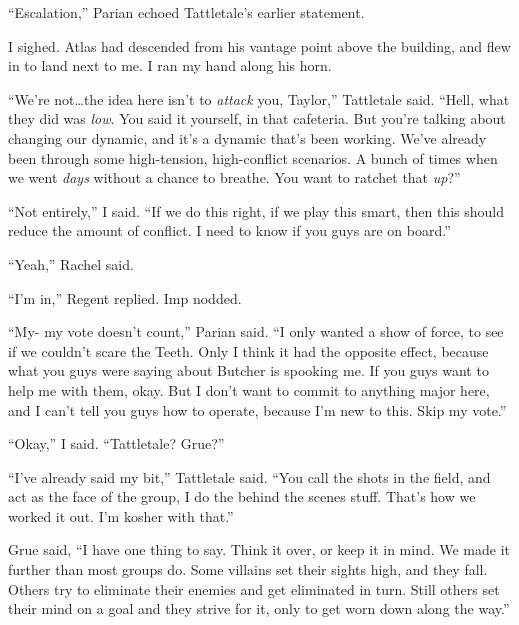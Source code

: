 ``Escalation,'' Parian echoed Tattletale's earlier statement.



I sighed.  Atlas had descended from his vantage point above the building, and flew in to land next to me.  I ran my hand along his horn.



``We're not\ldots the idea here isn't to \emph{attack} you, Taylor,'' Tattletale said.  ``Hell, what they did was \emph{low}.  You said it yourself, in that cafeteria.  But you're talking about changing our dynamic, and it's a dynamic that's been working.  We've already been through some high-tension, high-conflict scenarios.  A bunch of times when we went \emph{days} without a chance to breathe.  You want to ratchet that \emph{up}?''



``Not entirely,'' I said.  ``If we do this right, if we play this smart, then this should reduce the amount of conflict.  I need to know if you guys are on board.''



``Yeah,'' Rachel said.



``I'm in,'' Regent replied.  Imp nodded.



``My- my vote doesn't count,'' Parian said.  ``I only wanted a show of force, to see if we couldn't scare the Teeth.  Only I think it had the opposite effect, because what you guys were saying about Butcher is spooking me.  If you guys want to help me with them, okay.  But I don't want to commit to anything major here, and I can't tell you guys how to operate, because I'm new to this.  Skip my vote.''



``Okay,'' I said.  ``Tattletale?  Grue?''



``I've already said my bit,'' Tattletale said.  ``You call the shots in the field, and act as the face of the group, I do the behind the scenes stuff.  That's how we worked it out.  I'm kosher with that.''



Grue said, ``I have one thing to say.  Think it over, or keep it in mind.  We made it further than most groups do.  Some villains set their sights high, and they fall.  Others try to eliminate their enemies and get eliminated in turn.  Still others set their mind on a goal and they strive for it, only to get worn down along the way.''



